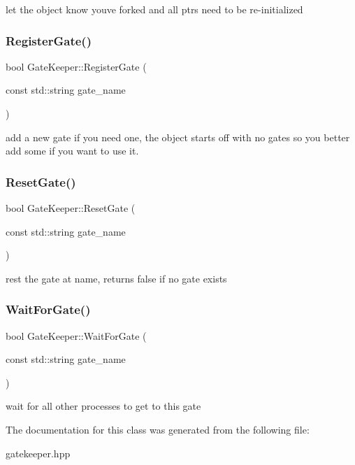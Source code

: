 let the object know you\textquotesingle{}ve forked and all ptrs need to be re-\/initialized \hypertarget{class_gate_keeper_a3ae6feee6b303373f18bf78e05663fd0}{}\label{class_gate_keeper_a3ae6feee6b303373f18bf78e05663fd0} 
\subsubsection{\texorpdfstring{Register\+Gate()}{RegisterGate()}}
{\footnotesize\ttfamily bool Gate\+Keeper\+::\+Register\+Gate (\begin{DoxyParamCaption}\item[{const std\+::string}]{gate\+\_\+name }\end{DoxyParamCaption})}

add a new gate if you need one, the object starts off with no gates so you better add some if you want to use it. \hypertarget{class_gate_keeper_a3c8a90e18b355301102e952e70dc7d2c}{}\label{class_gate_keeper_a3c8a90e18b355301102e952e70dc7d2c} 
\subsubsection{\texorpdfstring{Reset\+Gate()}{ResetGate()}}
{\footnotesize\ttfamily bool Gate\+Keeper\+::\+Reset\+Gate (\begin{DoxyParamCaption}\item[{const std\+::string}]{gate\+\_\+name }\end{DoxyParamCaption})}

rest the gate at name, returns false if no gate exists \hypertarget{class_gate_keeper_aed9fa041ed2db04d102918d4e3e96bc6}{}\label{class_gate_keeper_aed9fa041ed2db04d102918d4e3e96bc6} 
\subsubsection{\texorpdfstring{Wait\+For\+Gate()}{WaitForGate()}}
{\footnotesize\ttfamily bool Gate\+Keeper\+::\+Wait\+For\+Gate (\begin{DoxyParamCaption}\item[{const std\+::string}]{gate\+\_\+name }\end{DoxyParamCaption})}

wait for all other processes to get to this gate 

The documentation for this class was generated from the following file\+:\begin{DoxyCompactItemize}
\item 
gatekeeper.\+hpp\end{DoxyCompactItemize}

